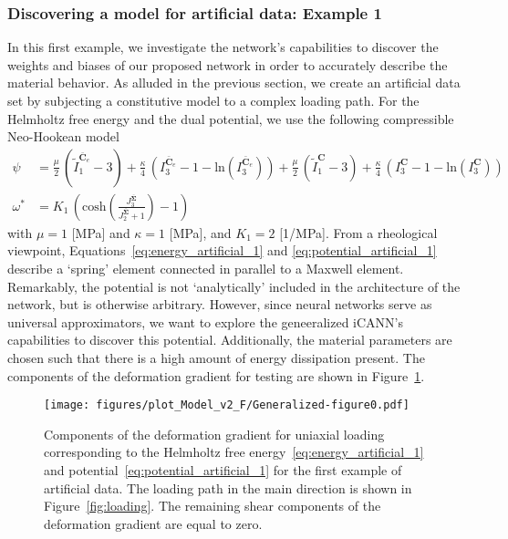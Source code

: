 \subsubsection{Discovering a model for artificial data: Example 1}
\label{sec:results_artificial_1}
%
In this first example, we investigate the network's capabilities to discover the weights and biases of our proposed network in order to accurately describe the material behavior.
As alluded in the previous section, we create an artificial data set by subjecting a constitutive model to a complex loading path.
For the Helmholtz free energy and the dual potential, we use the following compressible Neo-Hookean model
%
\begin{align}
    \psi &= \frac{\mu}{2}\,\left(\tilde{I}_1^{\bar{\bm{C}}_e} - 3 \right) + \frac{\kappa}{4}\, \left( I_3^{\bar{\bm{C}}_e} - 1 - \mathrm{ln}\left(I_3^{\bar{\bm{C}}_e}\right)\right) + \frac{\mu}{2}\,\left(\tilde{I}_1^{\bm{C}} - 3 \right) + \frac{\kappa}{4}\, \left( I_3^{\bm{C}} - 1 - \mathrm{ln}\left(I_3^{\bm{C}}\right)\right) \label{eq:energy_artificial_1}\\
    \omega^* &= K_1\, \left(\mathrm{cosh}\left( \frac{J_3^{\bar{\bm{\Sigma}}}}{J_2^{\bar{\bm{\Sigma}}} + 1} \right) - 1 \right) \label{eq:potential_artificial_1}
\end{align}
%
with $\mu=1$ [MPa] and $\kappa=1$ [MPa], and $K_1=2$ [1/MPa].
From a rheological viewpoint, Equations~\eqref{eq:energy_artificial_1} and \eqref{eq:potential_artificial_1} describe a `spring' element connected in parallel to a Maxwell element.
Remarkably, the potential is not `analytically' included in the architecture of the network, but is otherwise arbitrary.
However, since neural networks serve as universal approximators, we want to explore the geneeralized iCANN's capabilities to discover this potential.
Additionally, the material parameters are chosen such that there is a high amount of energy dissipation present.
The components of the deformation gradient for testing are shown in Figure~\ref{fig:results_artificial_1_deformation}.
%
\begin{figure}[h]
    \centering
    \texttt{[image: figures/plot\_Model\_v2\_F/Generalized-figure0.pdf]}
    \caption{Components of the deformation gradient for uniaxial loading corresponding to the Helmholtz free energy~\eqref{eq:energy_artificial_1} and potential~\eqref{eq:potential_artificial_1} for the first example of artificial data.
    The loading path in the main direction is shown in Figure~\ref{fig:loading}. The remaining shear components of the deformation gradient are equal to zero.}
    \label{fig:results_artificial_1_deformation}
\end{figure}\newline
%

